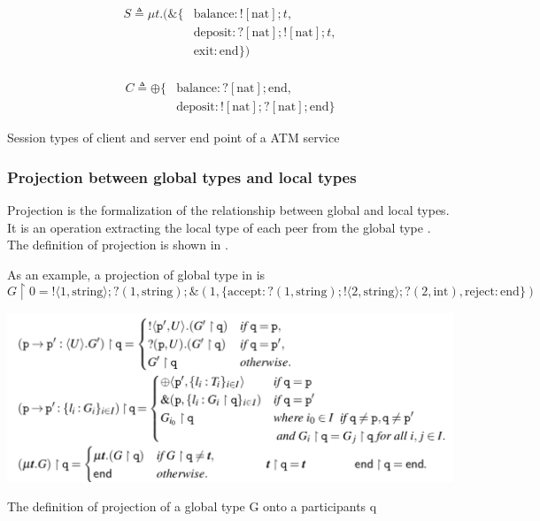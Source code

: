 \begin{table}[ht]
  \begin{minipage}{0.45\textwidth}
    \begin{align*}
      S \triangleq \mu t.(\&\{ & \text{balance}: ![\text{nat}];t, \\
        & \text{deposit}: ?[\text{nat}];![\text{nat}];t, \\
        & \text{exit}: \text{end}\}) \\
    \end{align*}
  \end{minipage}
  \hfill
  \begin{minipage}{0.45\textwidth}
    \begin{align*}
      C \triangleq \oplus \{ &\text{balance}: ?[\text{nat}];\text{end}, \\
                             &\text{deposit}: ![\text{nat}];?[\text{nat}];\text{end} \} 
    \end{align*}
  \end{minipage}
  \caption{Session types of client and server end point of a ATM service}
  \label{b:mpst:ltex}
\end{table}
\subsubsection{Projection between global types and local types} \label{b:mpst:proj}
Projection is the formalization of the relationship between global and local types. It is an operation extracting the local type of each peer from the global type \cite{coppoGentleIntroductionMultiparty2015}. The definition of projection is shown in .

As an example, a projection of global type in  is
$$
  G \upharpoonright 0 = !\langle 1, \text{string} \rangle;?(1, \text{string});\&(1, \{ \text{accept}: ?(1, \text{string});!\langle 2, \text{string} \rangle;?(2, \text{int}), 
  \text{reject}: \text{end} \})
$$  
\begin{table}[H]
\includegraphics[width=\textwidth]{background/image/proj-def.png}
\caption{The definition of projection of a global type G onto a participants q\cite{coppoGentleIntroductionMultiparty2015}}
\label{b:mpst:pdef}
\end{table}
